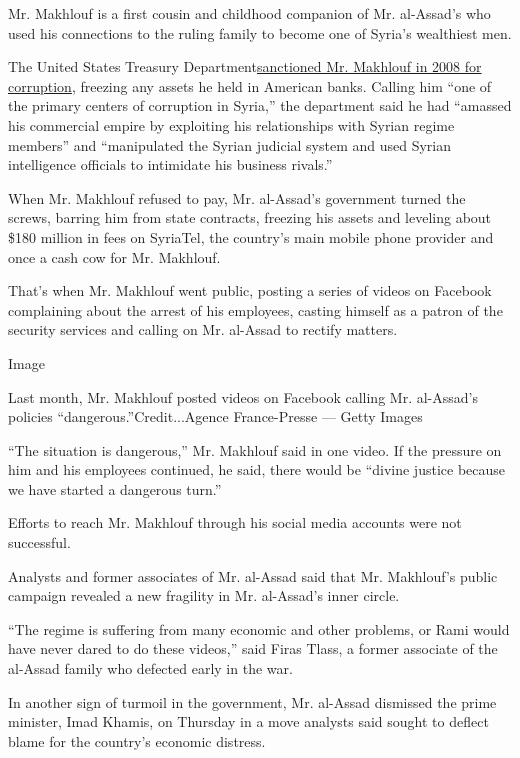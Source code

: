 Mr. Makhlouf is a first cousin and childhood companion of Mr. al-Assad's
who used his connections to the ruling family to become one of Syria's
wealthiest men.

The United States Treasury
Department\href{https://www.treasury.gov/press-center/press-releases/Pages/hp834.aspx}{sanctioned
Mr. Makhlouf in 2008 for corruption}, freezing any assets he held in
American banks. Calling him ``one of the primary centers of corruption
in Syria,'' the department said he had ``amassed his commercial empire
by exploiting his relationships with Syrian regime members'' and
``manipulated the Syrian judicial system and used Syrian intelligence
officials to intimidate his business rivals.''

When Mr. Makhlouf refused to pay, Mr. al-Assad's government turned the
screws, barring him from state contracts, freezing his assets and
leveling about \$180 million in fees on SyriaTel, the country's main
mobile phone provider and once a cash cow for Mr. Makhlouf.

That's when Mr. Makhlouf went public, posting a series of videos on
Facebook complaining about the arrest of his employees, casting himself
as a patron of the security services and calling on Mr. al-Assad to
rectify matters.

Image

Last month, Mr. Makhlouf posted videos on Facebook calling Mr.
al-Assad's policies ``dangerous.''Credit...Agence France-Presse ---
Getty Images

``The situation is dangerous,'' Mr. Makhlouf said in one video. If the
pressure on him and his employees continued, he said, there would be
``divine justice because we have started a dangerous turn.''

Efforts to reach Mr. Makhlouf through his social media accounts were not
successful.

Analysts and former associates of Mr. al-Assad said that Mr. Makhlouf's
public campaign revealed a new fragility in Mr. al-Assad's inner circle.

``The regime is suffering from many economic and other problems, or Rami
would have never dared to do these videos,'' said Firas Tlass, a former
associate of the al-Assad family who defected early in the war.

In another sign of turmoil in the government, Mr. al-Assad dismissed the
prime minister, Imad Khamis, on Thursday in a move analysts said sought
to deflect blame for the country's economic distress.

